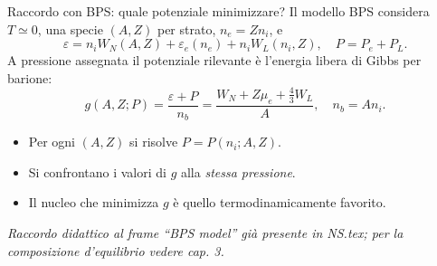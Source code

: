 \begin{frame}[t]{Raccordo con BPS: quale potenziale minimizzare?}
\small
Il modello BPS considera $T\simeq0$, una specie $(A,Z)$ per strato, $n_e=Zn_i$, e
\[
 \varepsilon=n_iW_N(A,Z)+\varepsilon_e(n_e)+n_iW_L(n_i,Z),
 \quad P=P_e+P_L.
\]
A pressione assegnata il potenziale rilevante è l'energia libera di Gibbs per barione:
\[
 \boxed{g(A,Z;P)=\frac{\varepsilon+P}{n_b}
 =\frac{W_N+Z\mu_e+\tfrac43 W_L}{A}},\quad n_b=An_i.
\]
\begin{itemize}
\item Per ogni $(A,Z)$ si risolve $P=P(n_i;A,Z)$.
\item Si confrontano i valori di $g$ alla \emph{stessa pressione}.
\item Il nucleo che minimizza $g$ è quello termodinamicamente favorito.
\end{itemize}
\par\scriptsize\emph{Raccordo didattico al frame ``BPS model'' già presente in NS.tex; per la composizione d'equilibrio vedere cap. 3.}
\end{frame}


